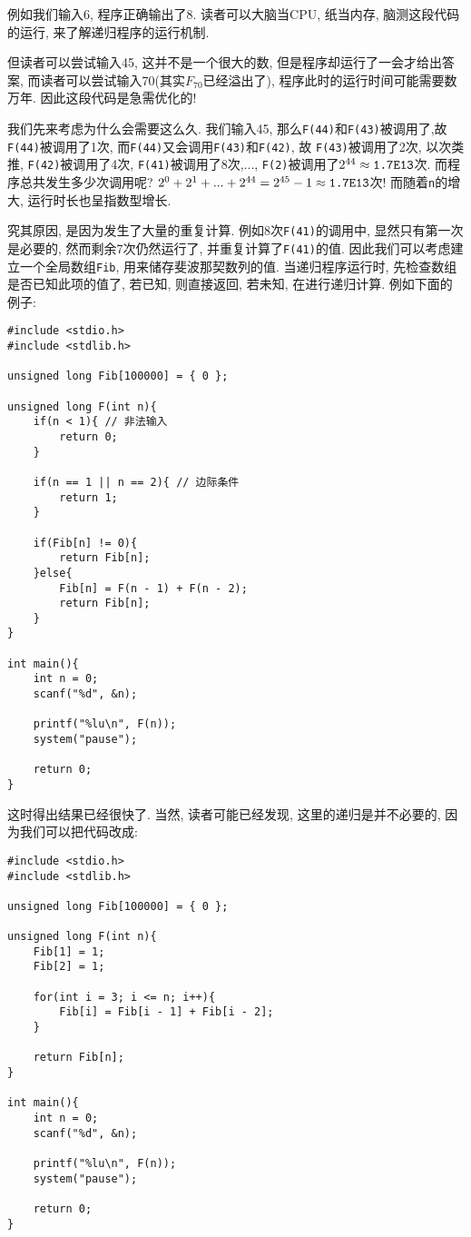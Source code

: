         例如我们输入6, 程序正确输出了8. 读者可以大脑当CPU, 纸当内存, 脑测这段代码的运行, 来了解递归程序的运行机制.

        但读者可以尝试输入45, 这并不是一个很大的数, 但是程序却运行了一会才给出答案, 而读者可以尝试输入70(其实$F_70$已经溢出了), 程序此时的运行时间可能需要数万年. 因此这段代码是急需优化的!

        我们先来考虑为什么会需要这么久. 我们输入45, 那么\texttt{F(44)}和\texttt{F(43)}被调用了,故 \texttt{F(44)}被调用了1次, 而\texttt{F(44)}又会调用\texttt{F(43)}和\texttt{F(42)}, 故 \texttt{F(43)}被调用了2次, 以次类推, \texttt{F(42)}被调用了4次, \texttt{F(41)}被调用了8次,..., \texttt{F(2)}被调用了$2^{44} \approx \mbox{\texttt{1.7E13}}$次. 而程序总共发生多少次调用呢? $2^0 + 2^1 + ... + 2^{44} = 2^{45} - 1 \approx \mbox{\texttt{1.7E13}}$次! 而随着\texttt{n}的增大, 运行时长也呈指数型增长.

        究其原因, 是因为发生了大量的重复计算. 例如8次\texttt{F(41)}的调用中, 显然只有第一次是必要的, 然而剩余7次仍然运行了, 并重复计算了\texttt{F(41)}的值. 因此我们可以考虑建立一个全局数组\texttt{Fib}, 用来储存斐波那契数列的值. 当递归程序运行时, 先检查数组是否已知此项的值了, 若已知, 则直接返回, 若未知, 在进行递归计算. 例如下面的例子:
\begin{lstlisting}
#include <stdio.h>
#include <stdlib.h>

unsigned long Fib[100000] = { 0 };

unsigned long F(int n){
    if(n < 1){ // 非法输入
        return 0;
    }

    if(n == 1 || n == 2){ // 边际条件
        return 1;
    }

    if(Fib[n] != 0){
        return Fib[n];
    }else{
        Fib[n] = F(n - 1) + F(n - 2);
        return Fib[n];
    }
}

int main(){
    int n = 0;
    scanf("%d", &n);

    printf("%lu\n", F(n));
    system("pause");

    return 0;
}
\end{lstlisting}

        这时得出结果已经很快了. 当然, 读者可能已经发现, 这里的递归是并不必要的, 因为我们可以把代码改成:
\begin{lstlisting}
#include <stdio.h>
#include <stdlib.h>

unsigned long Fib[100000] = { 0 };

unsigned long F(int n){
    Fib[1] = 1;
    Fib[2] = 1;

    for(int i = 3; i <= n; i++){
        Fib[i] = Fib[i - 1] + Fib[i - 2];
    }

    return Fib[n];
}

int main(){
    int n = 0;
    scanf("%d", &n);

    printf("%lu\n", F(n));
    system("pause");

    return 0;
}
\end{lstlisting}
        

